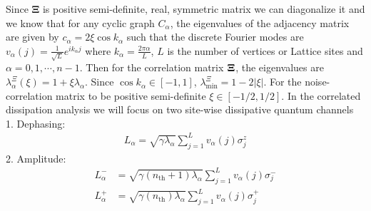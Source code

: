 \documentclass[aps,pra,reprint,amsmath,amssymb]{revtex4-2}
\begin{document}
Since $\mathbf{\Xi}$ is positive semi-definite, real, symmetric matrix we can diagonalize it 
and we know that for any cyclic graph $C_\alpha$, the eigenvalues of the adjacency matrix are given by $c_\alpha = 2\xi\cos{k_\alpha}$ such that the discrete Fourier modes are $v_\alpha(j)= \frac{1}{\sqrt{L}}e^{ik_\alpha j}$ where $k_\alpha=\frac{2\pi \alpha}{L}$, $L$ is the number of vertices or Lattice sites and $\alpha=0,1,\cdots,n-1$. Then for the correlation matrix $\bf{\Xi}$, the eigenvalues are $\lambda^{\Xi}_\alpha(\xi)=1+\xi \lambda_\alpha$. Since $\cos{k_\alpha}\in [-1,1]$, $\lambda^{\Xi}_{\text{min}}=1 - 2|\xi|$. For the noise-correlation matrix to be positive semi-definite $\xi \in [-1/2,1/2]$. 
In the correlated dissipation analysis we will focus on two site-wise dissipative quantum channels
\\[4pt]
1. Dephasing:
\begin{align}
    L_\alpha =  \sqrt{\gamma \lambda_\alpha} \sum_{j=1}^Lv_{\alpha}(j)\sigma^z_j
\end{align}
2. Amplitude:
\begin{align}
    L_\alpha^- &= \sqrt{\gamma (n_{\text{th}}+1)\lambda_\alpha}\sum_{j=1}^L v_\alpha(j)\sigma^-_j \nonumber\\
    L^+_\alpha &= \sqrt{\gamma (n_{\text{th}})\lambda_\alpha}\sum_{j=1}^L v_\alpha(j)\sigma_j^+
\end{align}
\end{document}
